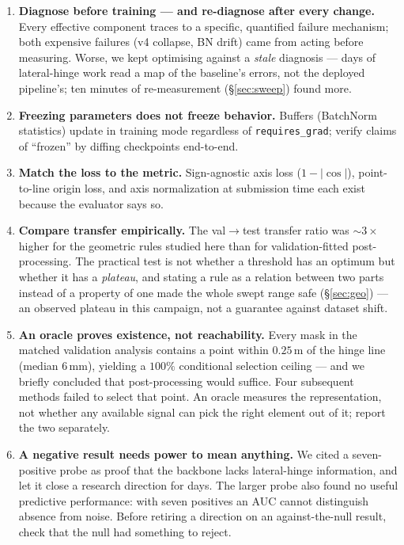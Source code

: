 \documentclass[11pt]{article}
\begin{document}
\begin{enumerate}
\item \textbf{Diagnose before training --- and re-diagnose after every
  change.} Every effective component traces to a specific, quantified
  failure mechanism; both expensive failures (v4 collapse, BN drift) came
  from acting before measuring. Worse, we kept optimising against a
  \emph{stale} diagnosis --- days of lateral-hinge work read a map of the
  baseline's errors, not the deployed pipeline's; ten minutes of
  re-measurement (\S\ref{sec:sweep}) found more.
\item \textbf{Freezing parameters does not freeze behavior.} Buffers
  (BatchNorm statistics) update in training mode regardless of
  \texttt{requires\_grad}; verify claims of ``frozen'' by diffing
  checkpoints end-to-end.
\item \textbf{Match the loss to the metric.} Sign-agnostic axis loss
  ($1-|\cos|$), point-to-line origin loss, and axis normalization at
  submission time each exist because the evaluator says so.
\item \textbf{Compare transfer empirically.} The val$\to$test
  transfer ratio was $\sim$$3\times$ higher for the geometric
  rules studied here than for validation-fitted post-processing. The practical test is
  not whether a threshold has an optimum but whether it has a
  \emph{plateau}, and stating a rule as a relation between two parts
  instead of a property of one made the whole swept range safe
  (\S\ref{sec:geo}) --- an observed plateau in this campaign, not a guarantee against
  dataset shift.
\item \textbf{An oracle proves existence, not reachability.} Every mask in the matched validation analysis contains a point within
  $0.25$\,m of the hinge line (median $6$\,mm), yielding a $100\%$
  conditional selection ceiling --- and we briefly concluded that post-processing would
  suffice. Four subsequent methods failed to select that point. An oracle
  measures the representation, not whether any available signal can pick
  the right element out of it; report the two separately.
\item \textbf{A negative result needs power to mean anything.} We cited a
  seven-positive probe as proof that the backbone lacks lateral-hinge
  information, and let it close a research direction for days. The larger probe also found no useful predictive performance: with seven positives an
  AUC cannot distinguish absence from noise. Before retiring a direction on
  an against-the-null result, check that the null had something to reject.
$$
\end{enumerate}
\end{document}
